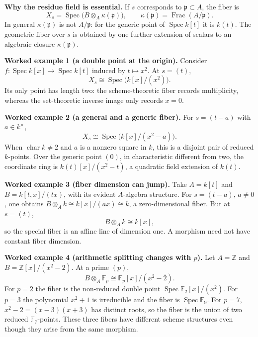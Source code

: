 \par\medskip
\noindent\textbf{Why the residue field is essential.}
If $s$ corresponds to $\mathfrak p\subset A$, the fiber is
\[
X_s=\operatorname{Spec}\!\bigl(B\otimes_A\kappa(\mathfrak p)\bigr),
\qquad
\kappa(\mathfrak p)=\operatorname{Frac}(A/\mathfrak p).
\]
In general $\kappa(\mathfrak p)$ is not $A/\mathfrak p$:
for the generic point of $\operatorname{Spec}k[t]$ it is $k(t)$.
The geometric fiber over $s$ is obtained by one further extension
of scalars to an algebraic closure $\overline{\kappa(\mathfrak p)}$.

\par\medskip
\noindent\textbf{Worked example 1 (a double point at the origin).}
Consider $f:\operatorname{Spec}k[x]\to\operatorname{Spec}k[t]$
induced by $t\mapsto x^2$. At $s=(t)$,
\[
X_s\cong\operatorname{Spec}\bigl(k[x]/(x^2)\bigr).
\]
Its only point has length two: the scheme-theoretic fiber records
multiplicity, whereas the set-theoretic inverse image only records
$x=0$.

\par\medskip
\noindent\textbf{Worked example 2 (a general and a generic fiber).}
For $s=(t-a)$ with $a\in k^\times$,
\[
X_s\cong\operatorname{Spec}\bigl(k[x]/(x^2-a)\bigr).
\]
When $\operatorname{char}k\ne2$ and $a$ is a nonzero square in $k$,
this is a disjoint pair of reduced $k$-points.  Over the generic
point $(0)$, in characteristic different from two, the coordinate
ring is $k(t)[x]/(x^2-t)$, a quadratic field extension of $k(t)$.

\par\medskip
\noindent\textbf{Worked example 3 (fiber dimension can jump).}
Take $A=k[t]$ and $B=k[t,x]/(tx)$, with its evident $A$-algebra
structure.  For $s=(t-a)$, $a\ne0$, one obtains
$B\otimes_A k\cong k[x]/(ax)\cong k$, a zero-dimensional fiber.
But at $s=(t)$,
\[
B\otimes_A k\cong k[x],
\]
so the special fiber is an affine line of dimension one.
A morphism need not have constant fiber dimension.

\par\medskip
\noindent\textbf{Worked example 4 (arithmetic splitting changes with $p$).}
Let $A=\mathbb Z$ and $B=\mathbb Z[x]/(x^2-2)$. At a prime $(p)$,
\[
B\otimes_A\mathbb F_p\cong
\mathbb F_p[x]/(x^2-\overline2).
\]
For $p=2$ the fiber is the non-reduced double point
$\operatorname{Spec}\mathbb F_2[x]/(x^2)$.
For $p=3$ the polynomial $x^2+1$ is irreducible and the fiber is
$\operatorname{Spec}\mathbb F_9$.
For $p=7$, $x^2-2=(x-3)(x+3)$ has distinct roots, so the
fiber is the union of two reduced $\mathbb F_7$-points.
These three fibers have different scheme structures even though
they arise from the same morphism.
